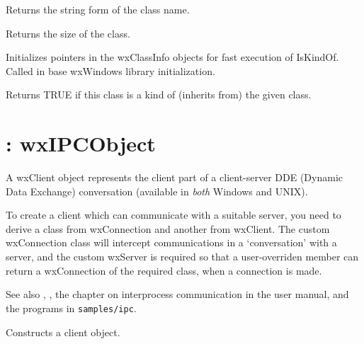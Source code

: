 

Returns the string form of the class name.



Returns the size of the class.



Initializes pointers in the wxClassInfo objects for fast execution
of IsKindOf. Called in base wxWindows library initialization.

\label{wxclassinfoiskindof}


Returns TRUE if this class is a kind of (inherits from) the given class.


\section{: wxIPCObject}\label{wxclient}


A wxClient object represents the client part of a client-server DDE
(Dynamic Data Exchange) conversation (available in {\it both}\/
Windows and UNIX).

To create a client which can communicate with a suitable server,
you need to derive a class from wxConnection and another from wxClient.
The custom wxConnection class will intercept communications in
a `conversation' with a server, and the custom wxServer is required
so that a user-overriden  member can return
a wxConnection of the required class, when a connection is made.

See also , ,
the chapter on interprocess communication in the user manual, and
the programs in {\tt samples/ipc}.




Constructs a client object.

\label{wxclientmakeconnection}

